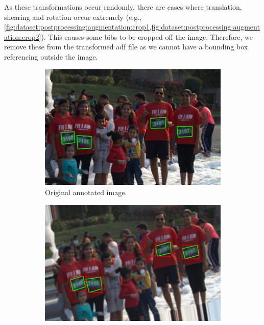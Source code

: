 As these transformations occur randomly, there are cases where translation, shearing and rotation occur extremely (e.g., \cref{fig:dataset:postprocessing:augmentation:crop1,fig:dataset:postprocessing:augmentation:crop2}). This causes some bibs to be cropped off the image. Therefore, we remove these from the transformed \gls{adf} file as we cannot have a bounding box referencing outside the image.

\begin{figure}[h!]
  \centering
  \hspace{\fill}
  \begin{subfigure}[b]{0.475\textwidth}
    \includegraphics[width=\textwidth]{images/dataset/augmentation/original}
    \caption{Original annotated image.}
  \end{subfigure}
  \hspace{\fill}
  \begin{subfigure}[b]{0.475\textwidth}
    \includegraphics[width=\textwidth]{images/dataset/augmentation/slight_rotate_blur}

\end{subfigure}
\end{figure}

